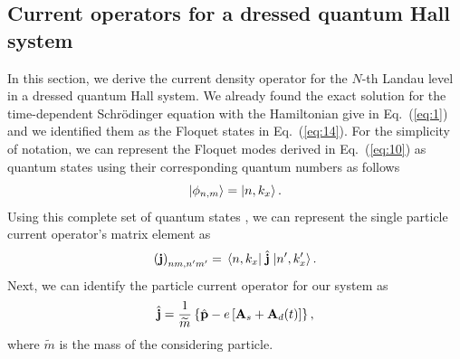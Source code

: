 \documentclass[
 reprint,
 amsmath,amssymb,
 aps,
 prb,
]{revtex4-2}
\begin{document}
\begin{appendix}
\section{\label{appendix_d} Current operators for a dressed quantum Hall system}

In this section, we derive the current density operator for the $N$-th Landau level in a dressed quantum Hall system. We already found the exact solution for the time-dependent Schrödinger equation with the Hamiltonian give in Eq.~(\ref{eq:1}) and we identified them as the Floquet states in Eq.~(\ref{eq:14}). For the simplicity of notation, we can represent the Floquet modes derived in Eq.~(\ref{eq:10}) as quantum states using their corresponding quantum numbers as follows
\begin{equation} \label{eq:d1}
  \ket{\phi_{n,m}} = \ket{n,k_x}.
\end{equation}
Using this complete set of quantum states \cite{wackerl20,holthaus15,grifoni98}, we can represent the single particle current operator's matrix element as
\begin{equation} \label{eq:d2}
  \left(\vb{j} \right)_{nm,n'm'} = \mel{n,k_x}{\;\hat{\vb{j}}\;}{n',k'_x}.
\end{equation}
Next, we can identify the particle current operator for our system \cite{mahan00,bruus04} as
\begin{equation} \label{eq:d3}
  \hat{\vb{j}} = \frac{1}{\widetilde{m}} \left\{\hat{\vb{p}} - e\left[\vb{A}_s + \vb{A}_d(t) \right]\right\},
\end{equation}
where $\widetilde{m}$ is the mass of the considering particle.


\end{appendix}
\end{document}
